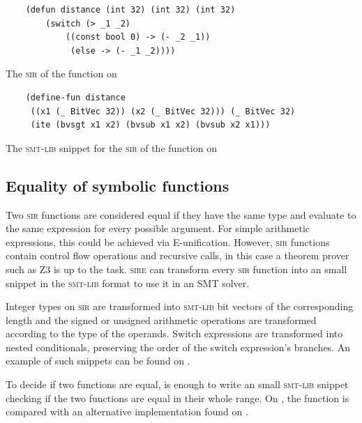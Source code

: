 \begin{listing}[h]
    \begin{verbatim}
    (defun distance (int 32) (int 32) (int 32) 
        (switch (> _1 _2) 
            ((const bool 0) -> (- _2 _1)) 
             (else -> (- _1 _2))))
    \end{verbatim}
    \caption{The \textsc{sir} of the  function on }
  \label{lst:sir_sire_example}
\end{listing}

\begin{listing}[h]
    \begin{verbatim}
    (define-fun distance 
     ((x1 (_ BitVec 32)) (x2 (_ BitVec 32))) (_ BitVec 32) 
     (ite (bvsgt x1 x2) (bvsub x1 x2) (bvsub x2 x1)))
    \end{verbatim}
    \caption{The \textsc{smt-lib} snippet for the \textsc{sir} of the  function on }
  \label{lst:smt_sire_example}
\end{listing}


\subsection{Equality of symbolic functions}

Two \textsc{sir} functions are considered equal if they have the same type and
evaluate to the same expression for every possible argument. For simple
arithmetic expressions, this could be achieved via E-unification. However,
\textsc{sir} functions contain control flow operations and recursive calls, in
this case a theorem prover such as Z3 is up to the task. \textsc{sire} can
transform every \textsc{sir} function into an small snippet in the
\textsc{smt-lib} format to use it in an SMT solver.

Integer types on \textsc{sir} are transformed into \textsc{smt-lib} bit vectors
of the corresponding length and the signed or unsigned arithmetic operations
are transformed according to the type of the operands. Switch expressions are
transformed into nested conditionals, preserving the order of the switch
expression's branches. An example of such snippets can be found on
. 

To decide if two functions are equal, is enough to write an small
\textsc{smt-lib} snippet checking if the two functions are equal in their whole
range. On , the  function is compared
with an alternative implementation found on . 

